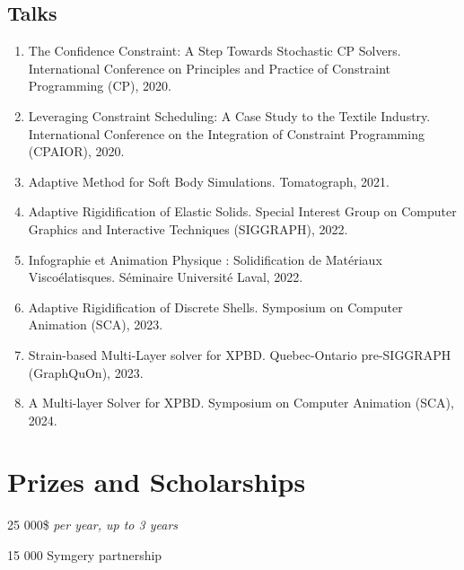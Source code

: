 \documentclass[10pt]{article} %
\begin{document}
\subsection{Talks}
\begin{enumerate}
  \setcounter{enumi}{\value{listCounter}}
  \item The Confidence Constraint: A Step Towards Stochastic CP Solvers. International Conference on Principles and Practice of Constraint Programming (CP), 2020.
  \item  Leveraging Constraint Scheduling: A Case Study to the Textile Industry. International Conference on the Integration of Constraint Programming (CPAIOR), 2020.
  \item Adaptive Method for Soft Body Simulations. Tomatograph, 2021.
  \item Adaptive Rigidification of Elastic Solids. Special Interest Group on Computer Graphics and Interactive Techniques (SIGGRAPH), 2022. 
  \item Infographie et Animation Physique : Solidification de Matériaux Viscoélatisques.  Séminaire Université Laval, 2022.
  \item Adaptive Rigidification of Discrete Shells. Symposium on Computer Animation (SCA), 2023. 
  \item Strain-based Multi-Layer solver for XPBD. Quebec-Ontario pre-SIGGRAPH (GraphQuOn), 2023.
  \item A Multi-layer Solver for XPBD. Symposium on Computer Animation (SCA), 2024. 
\end{enumerate}



\section{Prizes and Scholarships}

{
 25 000\$ \textit{per year, up to 3 years} \\
}

{
 15 000 Symgery partnership \\
}
\end{document}
